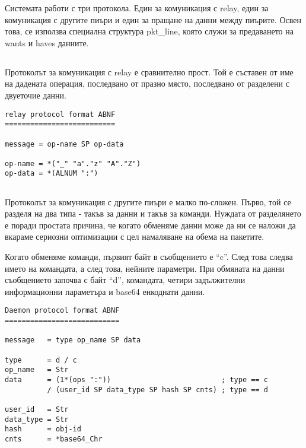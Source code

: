\documentclass[a4paper,12pt]{article}
\begin{document}
Системата работи с три протокола. Един за комуникация с relay, един за комуникация
с другите пиъри и един за пращане на данни между пиърите. Освен това, се използва
специална структура pkt\_line, която служи за предаването на wants и haves данните.

\subsection{}

Протоколът за комуникация с relay е сравнително прост. Той е съставен от име на
дадената операция, последвано от празно място, последвано от разделени с двуеточие
данни.

\begin{verbatim}
relay protocol format ABNF
==========================

message = op-name SP op-data

op-name = *("_" "a"."z" "A"."Z")
op-data = *(ALNUM ":")
\end{verbatim}

\subsection{}

Протоколът за комуникация с другите пиъри е малко по-сложен. Първо, той се
разделя на два типа - такъв за данни и такъв за команди. Нуждата от разделянето
е поради простата причина, че когато обменяме данни може да ни се наложи да
вкараме сериозни оптимизации с цел намаляване на обема на пакетите.

Когато обменяме команди, първият байт в съобщението е ``c''. След това следва името
на командата, а след това, нейните параметри. При обмяната на данни съобщението
започва с байт ``d'', командата, четири задължителни информационни параметъра
и base64 енкоднати данни.

\begin{verbatim}
Daemon protocol format ABNF
===========================

message   = type op_name SP data

type      = d / c
op_name   = Str
data      = (1*(ops ":"))                          ; type == c
          / (user_id SP data_type SP hash SP cnts) ; type == d

user_id   = Str
data_type = Str
hash      = obj-id
cnts      = *base64_Chr
\end{verbatim}

\subsection{}
\end{document}
